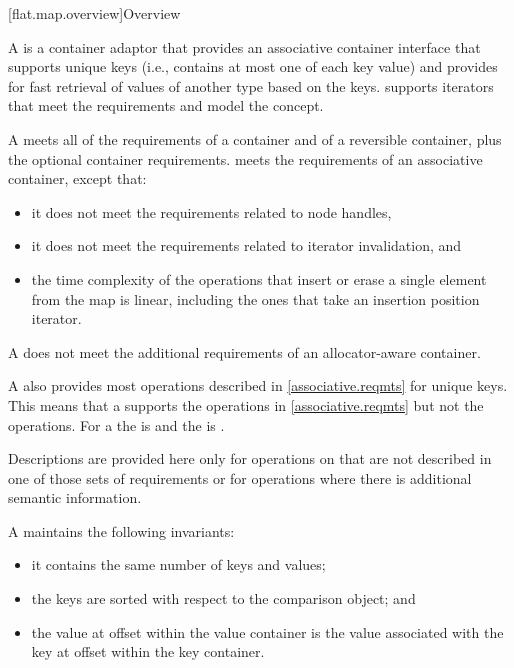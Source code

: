 [flat.map.overview]{Overview}

\pnum
{}%
A  is a container adaptor
that provides an associative container interface
that supports unique keys
(i.e., contains at most one of each key value) and
provides for fast retrieval of values of another type 
based on the keys.
 supports iterators
that meet the  requirements and
model the
 concept.

\pnum
A  meets all of the requirements
of a container and
of a reversible container,
plus the optional container requirements.
 meets the requirements of
an associative container,
except that:
\begin{itemize}
\item
it does not meet the requirements related to node handles,
\item
it does not meet the requirements related to iterator invalidation, and
\item
the time complexity of the operations that insert or erase a single
element from the map is linear, including the ones that take an insertion
position iterator.
\end{itemize}
\begin{note}
A  does not meet the additional requirements of
an allocator-aware container.
\end{note}

\pnum
A  also provides most operations
described in \ref{associative.reqmts} for unique keys.
This means that a  supports
the  operations in \ref{associative.reqmts}
but not the  operations.
For a 
the  is  and
the  is .

\pnum
Descriptions are provided here only for operations on  that
are not described in one of those sets of requirements or for operations where
there is additional semantic information.

\pnum
A  maintains the following invariants:
\begin{itemize}
\item
it contains the same number of keys and values;
\item
the keys are sorted with respect to the comparison object; and
\item
the value at offset  within the value container is
the value associated with the key at offset 
within the key container.
\end{itemize}

